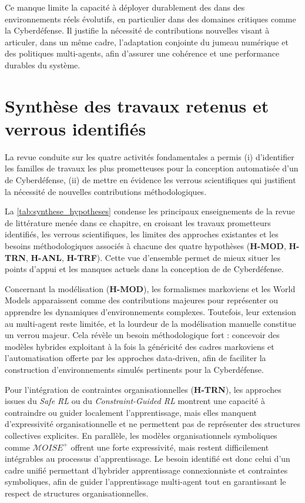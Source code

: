 Ce manque limite la capacité à déployer durablement des  dans des environnements réels évolutifs, en particulier dans des domaines critiques comme la Cyberdéfense. Il justifie la nécessité de contributions nouvelles visant à articuler, dans un même cadre, l'adaptation conjointe du jumeau numérique et des politiques multi-agents, afin d'assurer une cohérence et une performance durables du système.


\section*{Synthèse des travaux retenus et verrous identifiés}

La revue conduite sur les quatre activités fondamentales a permis
(i) d'identifier les familles de travaux les plus prometteuses pour la conception automatisée d'un  de Cyberdéfense,
(ii) de mettre en évidence les verrous scientifiques qui justifient la nécessité de nouvelles contributions méthodologiques.

\noindent
La \autoref{tab:synthese_hypotheses} condense les principaux enseignements de la revue de littérature menée dans ce chapitre, en croisant les travaux prometteurs identifiés, les verrous scientifiques, les limites des approches existantes et les besoins méthodologiques associés à chacune des quatre hypothèses (\textbf{H-MOD}, \textbf{H-TRN}, \textbf{H-ANL}, \textbf{H-TRF}). Cette vue d'ensemble permet de mieux situer les points d'appui et les manques actuels dans la conception de  de Cyberdéfense.

Concernant la modélisation (\textbf{H-MOD}), les formalismes markoviens et les World Models apparaissent comme des contributions majeures pour représenter ou apprendre les dynamiques d'environnements complexes. Toutefois, leur extension au multi-agent reste limitée, et la lourdeur de la modélisation manuelle constitue un verrou majeur. Cela révèle un besoin méthodologique fort : concevoir des modèles hybrides exploitant à la fois la généricité des cadres markoviens et l'automatisation offerte par les approches data-driven, afin de faciliter la construction d'environnements simulés pertinents pour la Cyberdéfense.

Pour l'intégration de contraintes organisationnelles (\textbf{H-TRN}), les approches issues du \textit{Safe RL} ou du \textit{Constraint-Guided RL} montrent une capacité à contraindre ou guider localement l'apprentissage, mais elles manquent d'expressivité organisationnelle et ne permettent pas de représenter des structures collectives explicites. En parallèle, les modèles organisationnels symboliques comme $\mathcal{M}OISE^+$ offrent une forte expressivité, mais restent difficilement intégrables au processus d'apprentissage. Le besoin identifié est donc celui d'un cadre unifié permettant d'hybrider apprentissage connexionniste et contraintes symboliques, afin de guider l'apprentissage multi-agent tout en garantissant le respect de structures organisationnelles.

